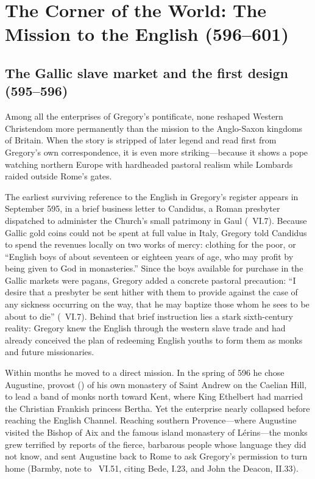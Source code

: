 \section{The Corner of the World: The Mission to the English (596--601)}

\subsection{The Gallic slave market and the first design (595--596)}

Among all the enterprises of Gregory's pontificate, none reshaped Western
Christendom more permanently than the mission to the Anglo-Saxon kingdoms of
Britain. When the story is stripped of later legend and read first from
Gregory's own correspondence, it is even more striking---because it shows a
pope watching northern Europe with hardheaded pastoral realism while Lombards
raided outside Rome's gates.

The earliest surviving reference to the English in Gregory's register appears
in September 595, in a brief business letter to Candidus, a Roman presbyter
dispatched to administer the Church's small patrimony in Gaul (\
VI.7). Because Gallic gold coins could not be spent at full value in Italy,
Gregory told Candidus to spend the revenues locally on two works of mercy:
clothing for the poor, or ``English boys of about seventeen or eighteen years
of age, who may profit by being given to God in monasteries.'' Since the boys
available for purchase in the Gallic markets were pagans, Gregory added a
concrete pastoral precaution: ``I desire that a presbyter be sent hither with
them to provide against the case of any sickness occurring on the way, that he
may baptize those whom he sees to be about to die'' (\work{Ep.}\ VI.7). Behind
that brief instruction lies a stark sixth-century reality: Gregory knew the
English through the western slave trade and had already conceived the plan of
redeeming English youths to form them as monks and future missionaries.

Within months he moved to a direct mission. In the spring of 596 he chose
Augustine, provost (\latin{praepositus}) of his own monastery of Saint Andrew
on the Caelian Hill, to lead a band of monks north toward Kent, where King
Ethelbert had married the Christian Frankish princess Bertha. Yet the
enterprise nearly collapsed before reaching the English Channel. Reaching
southern Provence---where Augustine visited the Bishop of Aix and the famous
island monastery of L\'erins---the monks grew terrified by reports of the
fierce, barbarous people whose language they did not know, and sent Augustine
back to Rome to ask Gregory's permission to turn home (Barmby, note to
\work{Ep.}\ VI.51, citing Bede, \work{Historia Ecclesiastica} I.23, and John
the Deacon, \work{Vita} II.33).

